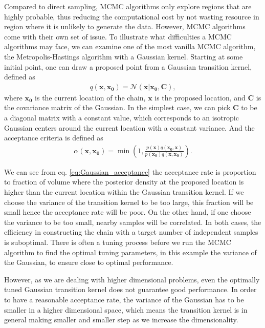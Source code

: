 \documentclass[twocolumn]{aastex631}
\begin{document}
Compared to direct sampling, MCMC algorithms only explore regions that are
highly probable, thus reducing the computational cost by not wasting resource in
region where it is unlikely to generate the data. However, MCMC algorithms come
with their own set of issue. To illustrate what difficulties a MCMC algorithms
may face, we can examine one of the most vanilla MCMC algorithm, the
Metropolis-Hastings algorithm with a Gaussian kernel. Starting at some initial
point, one can draw a proposed point from a Gaussian transition kernel, defined
as
\begin{align}
    q(\mathbf{x},\mathbf{x_0})= \mathcal{N}(\mathbf{x}|\mathbf{x_0},\mathbf{C}),
\end{align}
where $\mathbf{x_0}$ is the current location of the chain,
$\mathbf{x}$ is the proposed location, and $\mathbf{C}$ is the
covariance matrix of the Gaussian. In the simplest case, we can pick
$\mathbf{C}$ to be a diagonal matrix with a constant value, which corresponds to
an isotropic Gaussian centers around the current location with a constant variance.
And the acceptance criteria is defined as
\begin{align}
\alpha(\mathbf{x},\mathbf{x_0}) = \min\left(1,\frac{p(\mathbf{x})q(\mathbf{x_0},\mathbf{x})}{p(\mathbf{x_0})q(\mathbf{x},\mathbf{x_0})}\right).
\label{eq:Gaussian_acceptance}
\end{align}

We can see from eq. \ref{eq:Gaussian_acceptance} the acceptance rate is
proportion to fraction of volume where the posterior density at the proposed
location is higher than the current location within the Gaussian transition
kernel. If we choose the variance of the transition kernel to be too large, this
fraction will be small hence the acceptance rate will be poor. On the other
hand, if one choose the variance to be too small, nearby samples will be
correlated. In both cases, the efficiency in constructing the chain with a
target number of independent samples is suboptimal. There is often a tuning
process before we run the MCMC algorithm to find the optimal tuning parameters,
in this example the variance of the Gaussian, to ensure close to optimal
performance.

However, as we are dealing with higher dimensional problems, even the optimally
tuned Gaussian transition kernel does not guarantee good performance. In order
to have a reasonable acceptance rate, the variance of the Gaussian has to be
smaller in a higher dimensional space, which means the transition kernel is in
general making smaller and smaller step as we increase the dimensionality.
\end{document}
